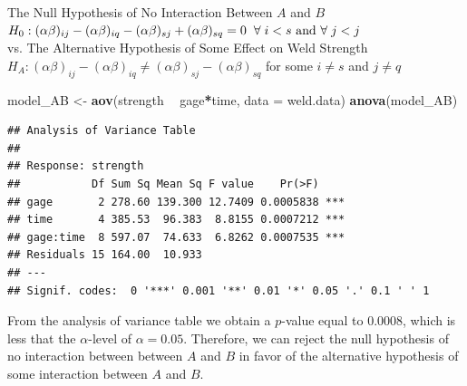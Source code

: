 \documentclass[12pt,]{article}
\newenvironment{Shaded}{\begin{snugshade}}{\end{snugshade}}
\newcommand{\KeywordTok}[1]{\textcolor[rgb]{0.13,0.29,0.53}{\textbf{#1}}}
\newcommand{\DataTypeTok}[1]{\textcolor[rgb]{0.13,0.29,0.53}{#1}}
\newcommand{\StringTok}[1]{\textcolor[rgb]{0.31,0.60,0.02}{#1}}
\newcommand{\OperatorTok}[1]{\textcolor[rgb]{0.81,0.36,0.00}{\textbf{#1}}}
\newcommand{\NormalTok}[1]{#1}
\begin{document}
\begin{center}
 The Null Hypothesis of No Interaction Between $A$ and $B$  
 $H_0 : (\alpha \beta)_{ij} - (\alpha \beta)_{iq} - (\alpha \beta)_{sj} + (\alpha \beta)_{sq}= 0 \hspace{.2cm }\forall \hspace{.1cm} i<s \text{ and }\forall  \hspace{.1cm} j<j$ \\
 vs. The Alternative Hypothesis of Some Effect on Weld Strength $H_A :  (\alpha \beta)_{ij} - (\alpha \beta)_{iq} \neq (\alpha \beta)_{sj} - (\alpha \beta)_{sq}$ for some $i\neq s$ and $j\neq q$ 
\end{center}

\begin{Shaded}
\end{Shaded}

\begin{Shaded}
\begin{Highlighting}[]
\NormalTok{model_AB <-}\StringTok{ }\KeywordTok{aov}\NormalTok{(strength }\OperatorTok{~}\StringTok{ }\NormalTok{gage}\OperatorTok{*}\NormalTok{time, }\DataTypeTok{data =}\NormalTok{ weld.data)}
\KeywordTok{anova}\NormalTok{(model_AB)}
\end{Highlighting}
\end{Shaded}

\begin{verbatim}
## Analysis of Variance Table
## 
## Response: strength
##           Df Sum Sq Mean Sq F value    Pr(>F)    
## gage       2 278.60 139.300 12.7409 0.0005838 ***
## time       4 385.53  96.383  8.8155 0.0007212 ***
## gage:time  8 597.07  74.633  6.8262 0.0007535 ***
## Residuals 15 164.00  10.933                      
## ---
## Signif. codes:  0 '***' 0.001 '**' 0.01 '*' 0.05 '.' 0.1 ' ' 1
\end{verbatim}

From the analysis of variance table we obtain a \(p\)-value equal to
\(0.0008\), which is less that the \(\alpha\)-level of
\(\alpha = 0.05\). Therefore, we can reject the null hypothesis of no
interaction between between \(A\) and \(B\) in favor of the alternative
hypothesis of some interaction between \(A\) and \(B\).
\end{document}
